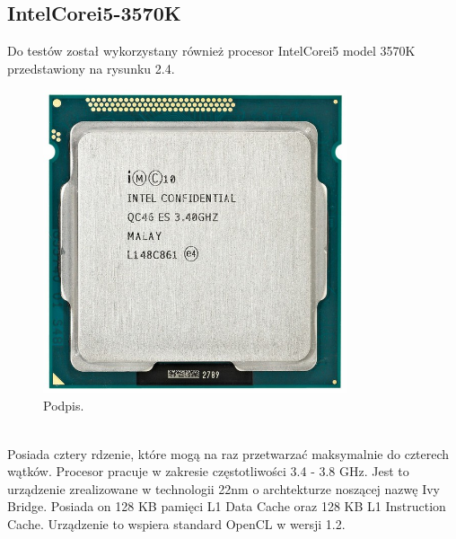 \subsection{Intel\textregistered Core\texttrademark i5-3570K}
Do testów został wykorzystany również procesor Intel\textregistered Core\texttrademark i5 model 3570K przedstawiony na rysunku 2.4. \\
\begin{figure}[h]
\centering
\includegraphics[width=0.8\textwidth]{figures/intel.jpg}
\caption{Podpis.}%
\label{rys:etykieta}
\end{figure} \\
Posiada cztery rdzenie, które mogą na raz przetwarzać maksymalnie do czterech wątków. Procesor pracuje w zakresie częstotliwości 3.4 - 3.8 GHz. Jest to urządzenie zrealizowane w technologii 22nm o archtekturze noszącej nazwę Ivy Bridge. Posiada on 128 KB pamięci L1 Data Cache oraz 128 KB L1 Instruction Cache. Urządzenie to wspiera standard OpenCL w wersji 1.2.
